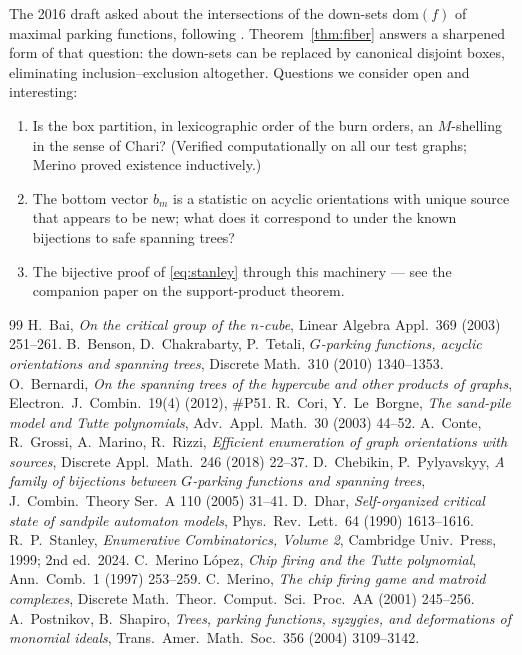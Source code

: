 \documentclass[11pt]{amsart}
\theoremstyle{definition}
\begin{document}
The 2016 draft asked about the intersections of the down-sets
$\mathrm{dom}(f)$ of maximal parking functions, following
\cite[Cor.~3.3]{bct}. Theorem~\ref{thm:fiber} answers a sharpened form of
that question: the down-sets can be replaced by canonical disjoint boxes,
eliminating inclusion--exclusion altogether. Questions we consider open and
interesting:
\begin{enumerate}
\item Is the box partition, in lexicographic order of the burn orders, an
$M$-shelling in the sense of Chari? (Verified computationally on all our
test graphs; Merino \cite{merino01} proved existence inductively.)
\item The bottom vector $b_m$ is a statistic on acyclic orientations with
unique source that appears to be new; what does it correspond to under the
known bijections to safe spanning trees?
\item The bijective proof of \eqref{eq:stanley} through this machinery ---
see the companion paper on the support-product theorem.
\end{enumerate}

\begin{thebibliography}{99}
 H.~Bai, \emph{On the critical group of the $n$-cube}, Linear
Algebra Appl.\ 369 (2003) 251--261.
 B.~Benson, D.~Chakrabarty, P.~Tetali, \emph{$G$-parking
functions, acyclic orientations and spanning trees}, Discrete Math.\ 310
(2010) 1340--1353.
 O.~Bernardi, \emph{On the spanning trees of the
hypercube and other products of graphs}, Electron.\ J.\ Combin.\ 19(4)
(2012), \#P51.
 R.~Cori, Y.~Le~Borgne, \emph{The sand-pile model and Tutte
polynomials}, Adv.\ Appl.\ Math.\ 30 (2003) 44--52.
 A.~Conte, R.~Grossi, A.~Marino, R.~Rizzi, \emph{Efficient
enumeration of graph orientations with sources}, Discrete Appl.\ Math.\ 246
(2018) 22--37.
 D.~Chebikin, P.~Pylyavskyy, \emph{A family of bijections
between $G$-parking functions and spanning trees}, J.\ Combin.\ Theory
Ser.~A 110 (2005) 31--41.
 D.~Dhar, \emph{Self-organized critical state of sandpile
automaton models}, Phys.\ Rev.\ Lett.\ 64 (1990) 1613--1616.
 R.~P.~Stanley, \emph{Enumerative Combinatorics, Volume 2},
Cambridge Univ.\ Press, 1999; 2nd ed.\ 2024.
 C.~Merino L\'opez, \emph{Chip firing and the Tutte
polynomial}, Ann.\ Comb.\ 1 (1997) 253--259.
 C.~Merino, \emph{The chip firing game and matroid
complexes}, Discrete Math.\ Theor.\ Comput.\ Sci.\ Proc.\ AA (2001)
245--256.
 A.~Postnikov, B.~Shapiro, \emph{Trees, parking functions,
syzygies, and deformations of monomial ideals}, Trans.\ Amer.\ Math.\ Soc.\
356 (2004) 3109--3142.
\end{thebibliography}
\end{document}
